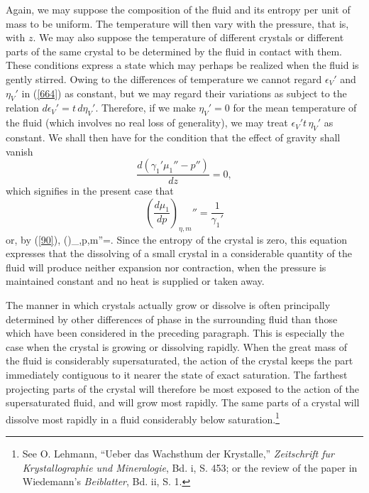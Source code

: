 \documentclass[12pt]{article}
\begin{document}
Again, we may suppose the composition of the fluid and its entropy per unit of mass to be uniform. The temperature will then vary with the pressure, that is, with $z$. We may also suppose the temperature of different crystals or different parts of the same crystal to be determined by the fluid in contact with them. These conditions express a state which may perhaps be realized when the fluid is gently stirred. Owing to the differences of temperature we cannot regard $\epsilon_V'$ and $\eta_V'$ in (\ref{664}) as constant, but we may regard their variations as subject to the relation $d\epsilon_V'= t \,d\eta_V'$. Therefore, if we make $\eta_V' =0$ for the mean temperature of the fluid (which involves no real loss of generality), we may treat $\epsilon_V' t \,\eta_V'$ as constant. We shall then have for the condition that the effect of gravity shall vanish
$$ \frac{d(\gamma_1'\mu_1'' -p'' )}{dz}=0,$$
which signifies in the present case that
$$ \left(\frac{d\mu_1}{dp}\right)_{\eta,m}''=\frac{1}{\gamma_1'}$$
or, by (\ref{90}),
\eqs \left(\right)_{\eta,p,m}''=.\label{670}\eqe
Since the entropy of the crystal is zero, this equation expresses that the dissolving of a small crystal in a considerable quantity of the fluid will produce neither expansion nor contraction, when the pressure is maintained constant and no heat is supplied or taken away.

The manner in which crystals actually grow or dissolve is often principally determined by other differences of phase in the surrounding fluid than those which have been considered in the preceding paragraph. This is especially the case when the crystal is growing or dissolving rapidly. When the great mass of the fluid is considerably supersaturated, the action of the crystal keeps the part immediately contiguous to it nearer the state of exact saturation. The farthest projecting parts of the crystal will therefore be most exposed to the action of the supersaturated fluid, and will grow most rapidly. The same parts of a crystal will dissolve most rapidly in a fluid considerably below saturation.\footnote{See O. Lehmann, ``Ueber das Wachsthum der Krystalle,'' \textit{Zeitschrift fur Krystallographie und Mineralogie}, Bd. i, S. 453; or the review of the paper in Wiedemann's \textit{Beiblatter}, Bd. ii, S. 1.}
\end{document}
